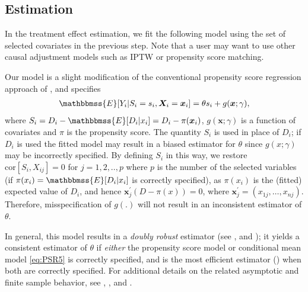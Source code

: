 \documentclass[11pt]{statsoc}
\begin{document}
\subsection{Estimation}

In the treatment effect estimation, we fit the following model using the set of selected covariates in the previous step.  Note that a user may want to use other causal adjustment models such as IPTW or propensity score matching.

Our model is a slight modification of the conventional propensity score regression approach of \cite{RobinsMarkNewey1992}, and specifies
\begin{align}
{\mathbbmss{E}}[Y_i|S_i=s_i, {\bm{X}}_i={\bm{x}}_i]=\theta s_i+ g({\bm{x}};\gamma), \label{eq:PSR5}
\end{align}
where $S_i=D_i-{\mathbbmss{E}}[D_i|x_i] = D_i -\pi({\bm{x}}_i)$, $g({\bm{x}};\gamma)$ is a function of
covariates and $\pi$ is the propensity score. The quantity $S_i$ is used in
place of $D_i$; if $D_i$ is used the fitted model may result in a biased estimator for $\theta$ since $g(x;\gamma)$ may be incorrectly specified. By defining $S_i$ in this way, we restore $\text{cor}[S_i,X_{ij}]=0$ for
$j=1,2,..,p$ where $p$ is the number of the selected variables (if $\pi(x_i) = {\mathbbmss{E}}[D_i|x_i]$ is correctly specified), as $\pi(x_i)$ is the (fitted) expected value of $D_i$, and hence ${\bm{x}}_j^{\prime} (D - \pi(x) )=0$, where ${\bm{x}}_j^{\prime} = (x_{1j},\ldots,x_{nj})$. Therefore,
misspecification of $g(.)$ will not result in an inconsistent estimator of $\theta$.

In general, this model results in a \textit{doubly robust} estimator (see \cite{davidian2005semiparametric}, \cite{Schafer2005} and \cite{bang2005doubly}); it yields a consistent estimator of $\theta$ if \textit{either} the propensity score model or conditional mean model \eqref{eq:PSR5} is correctly specified, and is the most efficient estimator (\cite{tsiatis2006semiparametric}) when both are correctly specified. For additional details on the related asymptotic and finite sample behavior, see \cite{kang2007demystifying}, \cite{neugebauer2005prefer}, \cite{van2003unified}
and \cite{robins1999robust}.
\end{document}
